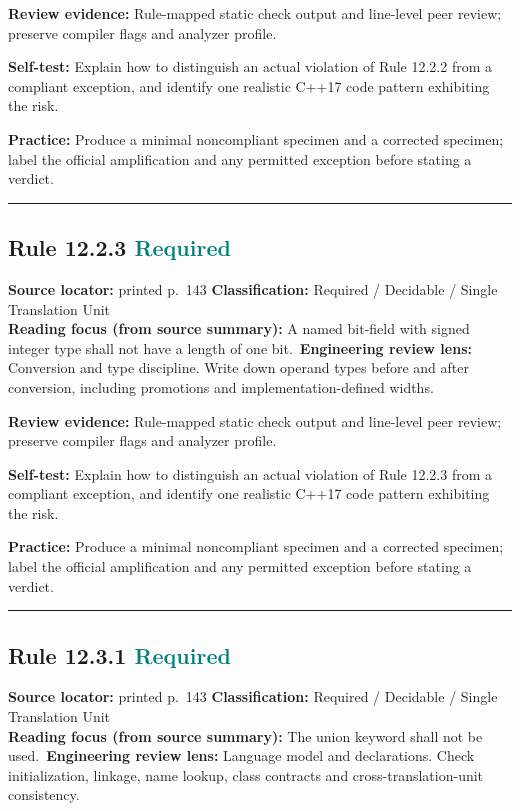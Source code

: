 \documentclass[10pt,letterpaper]{article}
\begin{document}
\textbf{Review evidence:} Rule-mapped static check output and line-level peer review; preserve compiler flags and analyzer profile.

\textbf{Self-test:} Explain how to distinguish an actual violation of Rule 12.2.2 from a compliant exception, and identify one realistic C++17 code pattern exhibiting the risk.\par
\textbf{Practice:} Produce a minimal noncompliant specimen and a corrected specimen; label the official amplification and any permitted exception before stating a verdict.
\smallskip\hrule\smallskip
\subsection*{Rule 12.2.3 \enspace \texorpdfstring{\small\textcolor{teal}{Required}}{Required}}
\noindent\textbf{Source locator:} printed p.~143 \quad\textbf{Classification:} Required / Decidable / Single Translation Unit\\
\textbf{Reading focus (from source summary):} A named bit-field with signed integer type shall not have a length of one bit.\
\textbf{Engineering review lens:} Conversion and type discipline. Write down operand types before and after conversion, including promotions and implementation-defined widths.

\textbf{Review evidence:} Rule-mapped static check output and line-level peer review; preserve compiler flags and analyzer profile.

\textbf{Self-test:} Explain how to distinguish an actual violation of Rule 12.2.3 from a compliant exception, and identify one realistic C++17 code pattern exhibiting the risk.\par
\textbf{Practice:} Produce a minimal noncompliant specimen and a corrected specimen; label the official amplification and any permitted exception before stating a verdict.
\smallskip\hrule\smallskip
\subsection*{Rule 12.3.1 \enspace \texorpdfstring{\small\textcolor{teal}{Required}}{Required}}
\noindent\textbf{Source locator:} printed p.~143 \quad\textbf{Classification:} Required / Decidable / Single Translation Unit\\
\textbf{Reading focus (from source summary):} The union keyword shall not be used.\
\textbf{Engineering review lens:} Language model and declarations. Check initialization, linkage, name lookup, class contracts and cross-translation-unit consistency.
\end{document}
